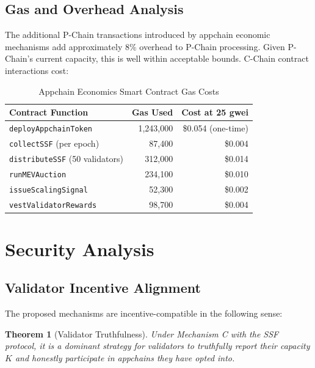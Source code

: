\documentclass[11pt]{article}
\newtheorem{theorem}{Theorem}
\begin{document}
\subsection{Gas and Overhead Analysis}

The additional P-Chain transactions introduced by appchain economic mechanisms add
approximately 8\% overhead to P-Chain processing. Given P-Chain's current capacity,
this is well within acceptable bounds. C-Chain contract interactions cost:

\begin{table}[H]
\centering
\caption{Appchain Economics Smart Contract Gas Costs}
\label{tab:econ_gas}
\begin{tabular}{lrr}
\toprule
\textbf{Contract Function} & \textbf{Gas Used} & \textbf{Cost at 25 gwei} \\
\midrule
\texttt{deployAppchainToken} & 1,243,000 & \$0.054 (one-time) \\
\texttt{collectSSF} (per epoch) & 87,400 & \$0.004 \\
\texttt{distributeSSF} (50 validators) & 312,000 & \$0.014 \\
\texttt{runMEVAuction} & 234,100 & \$0.010 \\
\texttt{issueScalingSignal} & 52,300 & \$0.002 \\
\texttt{vestValidatorRewards} & 98,700 & \$0.004 \\
\bottomrule
\end{tabular}
\end{table}

\section{Security Analysis}

\subsection{Validator Incentive Alignment}

The proposed mechanisms are incentive-compatible in the following sense:

\begin{theorem}[Validator Truthfulness]
Under Mechanism C with the SSF protocol, it is a dominant strategy for validators to
truthfully report their capacity $K$ and honestly participate in appchains they have opted into.
\end{theorem}
\end{document}
